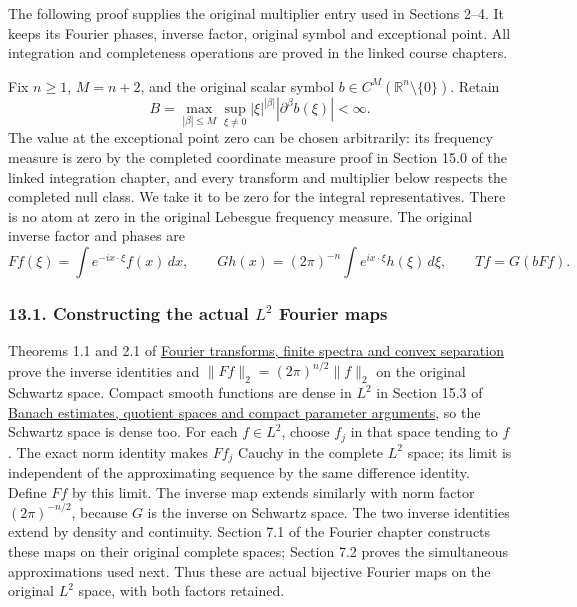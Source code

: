 \documentclass[
  11pt,
]{article}
\makeatletter
\let\ReaderOriginalAnchorStart\hyper@anchorstart
\let\ReaderOriginalAnchorEnd\hyper@anchorend
\let\ReaderPendingAliases\@empty
\def\ReaderArmAliases#1{\gdef\ReaderPendingAliases{#1}}
\def\hyper@anchorstart#1{\ReaderIfNativeAnchorTF{#1}{\ReaderPendingAliases\global\let\ReaderPendingAliases\@empty}{}\ReaderOriginalAnchorStart{#1}}
\makeatother
\begin{document}
The following proof supplies the original multiplier entry used in
Sections 2--4. It keeps its Fourier phases, inverse factor, original
symbol and exceptional point. All integration and completeness
operations are proved in the linked course chapters.

Fix \(n\geq1\), \(M=n+2\), and the original scalar symbol
\(b\in C^M(\mathbb R^n\setminus\{0\})\). Retain \[
 B=\max_{|\beta|\leq M}\sup_{\xi\ne0}
          |\xi|^{|\beta|}|\partial^\beta b(\xi)|<\infty .
                                                               \tag{MP1}
\] The value at the exceptional point zero can be chosen arbitrarily:
its frequency measure is zero by the completed coordinate measure proof
in Section 15.0 of the linked integration chapter, and every transform
and multiplier below respects the completed null class. We take it to be
zero for the integral representatives. There is no atom at zero in the
original Lebesgue frequency measure. The original inverse factor and
phases are \[
 Ff(\xi)=\int e^{-ix\cdot\xi}f(x)\,dx,\qquad
 Gh(x)=(2\pi)^{-n}\int e^{ix\cdot\xi}h(\xi)\,d\xi,\qquad
 Tf=G(bFf).
                                                               \tag{MP2}
\]

\ReaderArmAliases{\ReaderOriginalAnchorStart{AN03-LCE-MULT-001}\ReaderOriginalAnchorEnd\begingroup\expandafter\def\csname @currentHref\endcsname{AN03-LCE-MULT-001}\label{AN03-LCE-MULT-001}\endgroup\ReaderOriginalAnchorStart{constructing-the-actual-l2-fourier-maps}\ReaderOriginalAnchorEnd}
\subsubsection{\texorpdfstring{13.1. Constructing the actual \(L^2\)
Fourier
maps}{13.1. Constructing the actual L\^{}2 Fourier maps}}\label{constructing-the-actual-l2-fourier-maps}

Theorems 1.1 and 2.1 of \href{prerequisite-bridges.pdf}{Fourier
transforms, finite spectra and convex separation} prove the inverse
identities and \(\|Ff\|_2=(2\pi)^{n/2}\|f\|_2\) on the original Schwartz
space. Compact smooth functions are dense in \(L^2\) in Section 15.3 of
\href{banach-foundation-bridges.pdf}{Banach estimates, quotient spaces
and compact parameter arguments}, so the Schwartz space is dense too.
For each \(f\in L^2\), choose \(f_j\) in that space tending to \(f\).
The exact norm identity makes \(Ff_j\) Cauchy in the complete \(L^2\)
space; its limit is independent of the approximating sequence by the
same difference identity. Define \(Ff\) by this limit. The inverse map
extends similarly with norm factor \((2\pi)^{-n/2}\), because \(G\) is
the inverse on Schwartz space. The two inverse identities extend by
density and continuity. Section 7.1 of the Fourier chapter constructs
these maps on their original complete spaces; Section 7.2 proves the
simultaneous approximations used next. Thus these are actual bijective
Fourier maps on the original \(L^2\) space, with both factors retained.
\end{document}
